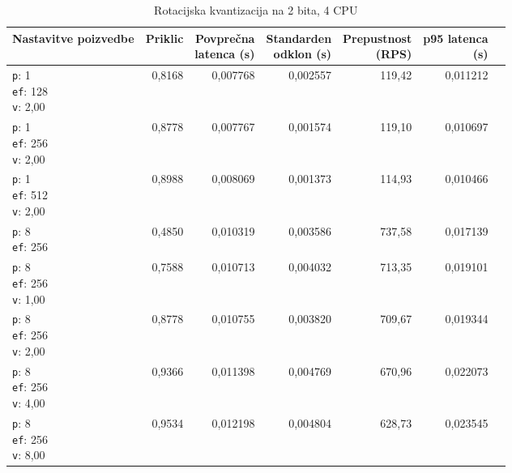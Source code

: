 \begin{table}[htbp]
  \centering
\small
  \caption{Rotacijska kvantizacija na 2 bita, 4 CPU}
  \label{tab:single-4cpu-4ram:tq2:qdrant-dipl-baseline-tenant-subgraph-tq2-ext-m16-ef-128-random-768-100-tenants-extended-upload-2026-08-19-23-31-39.json}
  \begin{tabularx}{\textwidth}{Xrrrrrr}
    \toprule
    Nastavitve poizvedbe & Priklic & \makecell{Povprečna\\latenca (s)} & \makecell{Standarden\\odklon (s)} & \makecell{Prepustnost\\(RPS)} & \makecell{p95 latenca\\(s)}  \\
    \midrule
    \makecell{\texttt{p}: 1\\\texttt{ef}: 128\\\texttt{v}: 2,00} & 0,8168 & 0,007768 & 0,002557 & 119,42 & 0,011212 \\
    \makecell{\texttt{p}: 1\\\texttt{ef}: 256\\\texttt{v}: 2,00} & 0,8778 & 0,007767 & 0,001574 & 119,10 & 0,010697 \\
    \makecell{\texttt{p}: 1\\\texttt{ef}: 512\\\texttt{v}: 2,00} & 0,8988 & 0,008069 & 0,001373 & 114,93 & 0,010466 \\
    \makecell{\texttt{p}: 8\\\texttt{ef}: 256} & 0,4850 & 0,010319 & 0,003586 & 737,58 & 0,017139 \\
    \makecell{\texttt{p}: 8\\\texttt{ef}: 256\\\texttt{v}: 1,00} & 0,7588 & 0,010713 & 0,004032 & 713,35 & 0,019101 \\
    \makecell{\texttt{p}: 8\\\texttt{ef}: 256\\\texttt{v}: 2,00} & 0,8778 & 0,010755 & 0,003820 & 709,67 & 0,019344 \\
    \makecell{\texttt{p}: 8\\\texttt{ef}: 256\\\texttt{v}: 4,00} & 0,9366 & 0,011398 & 0,004769 & 670,96 & 0,022073 \\
    \makecell{\texttt{p}: 8\\\texttt{ef}: 256\\\texttt{v}: 8,00} & 0,9534 & 0,012198 & 0,004804 & 628,73 & 0,023545 \\

\end{tabularx}
\end{table}
